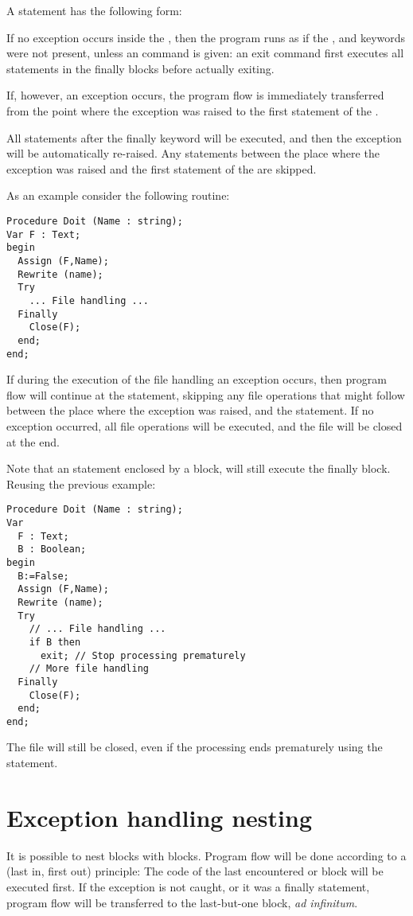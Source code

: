 A  statement has the following form:

If no exception occurs inside the , then the program
runs as if the ,  and  keywords were not
present, unless an  command is given: an exit command first 
executes all statements in the finally blocks before actually exiting.

If, however, an exception occurs, the program flow is immediately
transferred from the point where the exception was raised to the first
statement of the .

All statements after the finally keyword will be executed, and then
the exception will be automatically re-raised. Any statements between the
place where the exception was raised and the first statement of the
 are skipped.

As an example consider the following routine:
\begin{verbatim}
Procedure Doit (Name : string);
Var F : Text;
begin
  Assign (F,Name);
  Rewrite (name);
  Try
    ... File handling ...
  Finally
    Close(F);
  end;
end;
\end{verbatim}
If during the execution of the file handling an exception occurs, then
program flow will continue at the  statement, skipping any
file operations that might follow between the place where the exception
was raised, and the  statement.
If no exception occurred, all file operations will be executed, and the file
will be closed at the end.

Note that an  statement enclosed by a  block,
will still execute the finally block. Reusing the previous example:
\begin{verbatim}
Procedure Doit (Name : string);
Var 
  F : Text;
  B : Boolean;
begin
  B:=False;
  Assign (F,Name);
  Rewrite (name);
  Try
    // ... File handling ...
    if B then 
      exit; // Stop processing prematurely
    // More file handling
  Finally
    Close(F);
  end;
end;
\end{verbatim}
The file will still be closed, even if the processing ends prematurely using
the  statement.

\section{Exception handling nesting}
It is possible to nest  blocks with 
blocks. Program flow will be done according to a  (last in, first
out) principle: The code of the last encountered  or
  block will be executed first. If the exception is not
caught, or it was a finally statement, program flow will be transferred to
the last-but-one block, {\em ad infinitum}.

